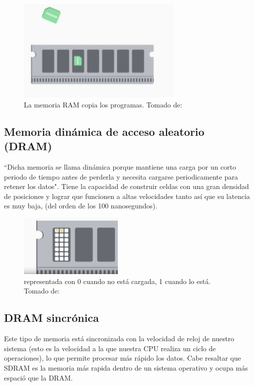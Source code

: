 \documentclass{article}
\begin{document}
\begin{figure}[h]
\includegraphics[width=8cm]{Captura.2.PNG}
\centering
\caption{La memoria RAM copia los programas. Tomado de:\cite{Coursera}}
\label{Captura.2.PNG}
\end{figure}
\subsection{Memoria dinámica de acceso aleatorio (DRAM)}
 ``Dicha memoria se llama dinámica porque mantiene una carga por un corto periodo de tiempo antes de perderla y necesita cargarse periodicamente para retener los datos"\cite[How computer memory works. 2:07]{TEDwebsite}. Tiene la capacidad de construir celdas con una gran densidad de posiciones y lograr que funcionen a altas velocidades tanto así que su latencia es muy baja, (del orden de los 100 nanosegundos).

\begin{figure}[h]
\includegraphics[width=5cm]{dram.PNG}
\centering
\caption{representada con 0 cuando no está cargada, 1 cuando lo está. \centering Tomado de:\cite{Coursera}}
\label{dram.PNG}
\end{figure}
\subsection{DRAM sincrónica}
Este tipo de memoria está sincronizada con la velocidad de reloj de nuestro sistema (esto es la velocidad a la que nuestra CPU realiza un ciclo de operaciones), lo que permite procesar más rápido los datos. Cabe resaltar que SDRAM es la memoria más rapida dentro de un sistema operativo y ocupa más espació que la DRAM.
\end{document}

